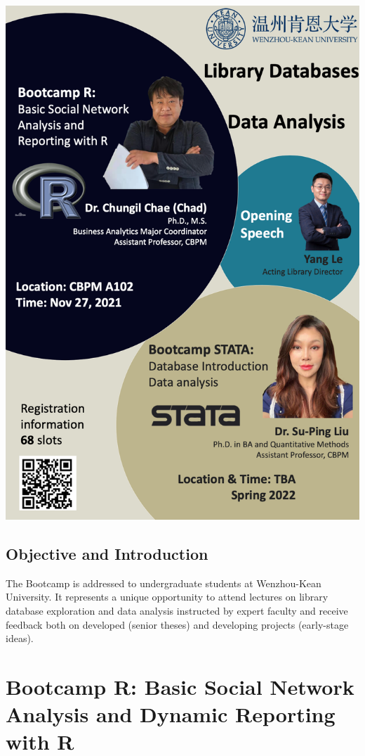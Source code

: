 \documentclass[
]{book}
\begin{document}
\includegraphics[width=6.25in,height=\textheight]{images/0.png}

\hypertarget{objective-and-introduction}{%
\section{Objective and Introduction}\label{objective-and-introduction}}

The Bootcamp is addressed to undergraduate students at Wenzhou-Kean University. It represents a unique opportunity to attend lectures on library database exploration and data analysis instructed by expert faculty and receive feedback both on developed (senior theses) and developing projects (early-stage ideas).

\hypertarget{bootcamp-r-basic-social-network-analysis-and-dynamic-reporting-with-r}{%
\chapter{Bootcamp R: Basic Social Network Analysis and Dynamic Reporting with R}\label{bootcamp-r-basic-social-network-analysis-and-dynamic-reporting-with-r}}
\end{document}
